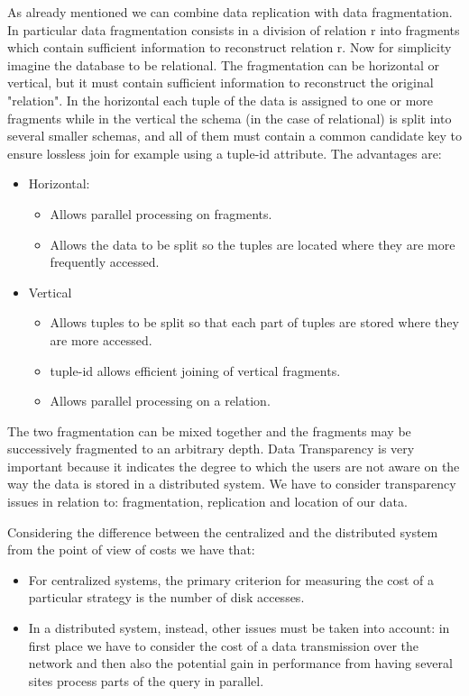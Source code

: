 \documentclass[a4page, 11pt]{article}
\begin{document}
As already mentioned we can combine data replication with data fragmentation. In particular data fragmentation consists in a division of relation r into fragments which contain sufficient information to reconstruct relation r.
Now for simplicity imagine the database to be relational. 
The fragmentation can be horizontal or vertical, but it must contain sufficient information to reconstruct the original "relation". In the horizontal each tuple of the data is assigned to one or more fragments while in the vertical the schema (in the case of relational) is split into several smaller schemas, and all of them must contain a common candidate key to ensure lossless join for example using a tuple-id attribute.
The advantages are:
\begin{itemize}[noitemsep]
	\item Horizontal:
	\begin{itemize}[noitemsep]
		\item Allows parallel processing on fragments.
		\item Allows the data to be split so the tuples are located where they are more frequently accessed.
	\end{itemize}
	\item Vertical
	\begin{itemize}[noitemsep]
		\item Allows tuples to be split so that each part of tuples are stored where they are more accessed.
		\item tuple-id allows efficient joining of vertical fragments.
		\item Allows parallel processing on a relation.
	\end{itemize}
\end{itemize}
The two fragmentation can be mixed together and the fragments may be successively fragmented to an arbitrary depth. 
Data Transparency is very important because it indicates the degree to which the users are not aware on the way the data is stored in a  distributed system. 
We have to consider transparency issues in relation to: fragmentation, replication and location of our data.

Considering the difference between the centralized and the distributed system from the point of view of costs we have that:
\begin{itemize}[noitemsep]
\item For centralized systems, the primary criterion for measuring the cost of a particular strategy is the number of disk accesses.
\item In a distributed system, instead, other issues must be taken into account: in first place we have to consider the cost of a data transmission over the network and then also the potential gain in performance from having several sites process parts of the query in parallel.
\end{itemize}
\end{document}
